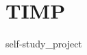 \chapter{TIMP }
\hypertarget{md__r_e_a_d_m_e}{}\label{md__r_e_a_d_m_e}
\label{md__r_e_a_d_m_e_autotoc_md0}%
%


self-\/study\+\_\+project 